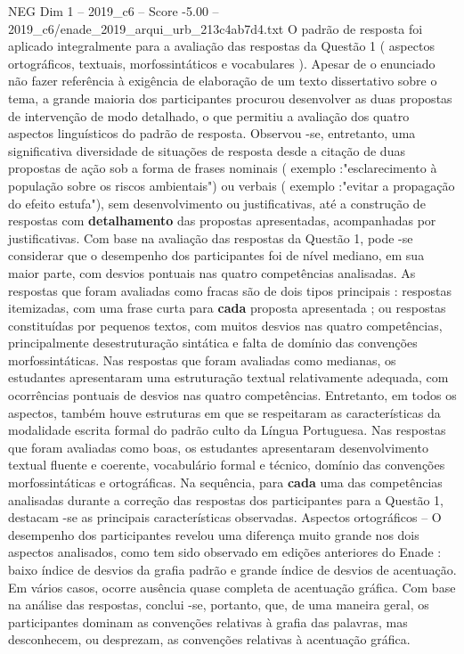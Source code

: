 \begin{textsample}{NEG Dim 1 – 2019\_c6 – Score -5.00 – 2019\_c6/enade\_2019\_arqui\_urb\_213c4ab7d4.txt}
O padrão de resposta foi aplicado integralmente para a avaliação das respostas da Questão 1 ( aspectos ortográficos, textuais, morfossintáticos e vocabulares ).
Apesar de o enunciado não fazer referência à exigência de elaboração de um texto dissertativo sobre o tema, a grande maioria dos participantes procurou desenvolver as duas propostas de intervenção de modo detalhado, o que permitiu a avaliação dos quatro aspectos linguísticos do padrão de resposta.
Observou -se, entretanto, uma significativa diversidade de situações de resposta desde a citação de duas propostas de ação sob a forma de frases nominais ( exemplo :"esclarecimento à população sobre os riscos ambientais") ou verbais ( exemplo :"evitar a propagação do efeito estufa"), sem desenvolvimento ou justificativas, até a construção de respostas com \textbf{detalhamento} das propostas apresentadas, acompanhadas por justificativas.
Com base na avaliação das respostas da Questão 1, pode -se considerar que o desempenho dos participantes foi de nível mediano, em sua maior parte, com desvios pontuais nas quatro competências analisadas.
As respostas que foram avaliadas como fracas são de dois tipos principais : respostas itemizadas, com uma frase curta para \textbf{cada} proposta apresentada ; ou respostas constituídas por pequenos textos, com muitos desvios nas quatro competências, principalmente desestruturação sintática e falta de domínio das convenções morfossintáticas.
Nas respostas que foram avaliadas como medianas, os estudantes apresentaram uma estruturação textual relativamente adequada, com ocorrências pontuais de desvios nas quatro competências.
Entretanto, em todos os aspectos, também houve estruturas em que se respeitaram as características da modalidade escrita formal do padrão culto da Língua Portuguesa.
Nas respostas que foram avaliadas como boas, os estudantes apresentaram desenvolvimento textual fluente e coerente, vocabulário formal e técnico, domínio das convenções morfossintáticas e ortográficas.
Na sequência, para \textbf{cada} uma das competências analisadas durante a correção das respostas dos participantes para a Questão 1, destacam -se as principais características observadas.
Aspectos ortográficos – O desempenho dos participantes revelou uma diferença muito grande nos dois aspectos analisados, como tem sido observado em edições anteriores do Enade : baixo índice de desvios da grafia padrão e grande índice de desvios de acentuação.
Em vários casos, ocorre ausência quase completa de acentuação gráfica.
Com base na análise das respostas, conclui -se, portanto, que, de uma maneira geral, os participantes dominam as convenções relativas à grafia das palavras, mas desconhecem, ou desprezam, as convenções relativas à acentuação gráfica.

\end{textsample}
